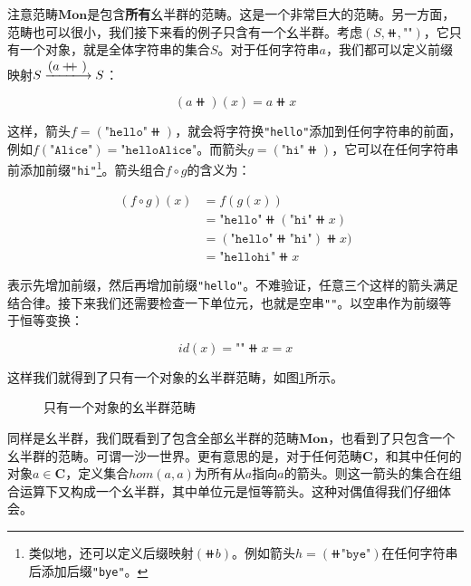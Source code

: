 \documentclass{article}
\begin{document}
注意范畴$\pmb{Mon}$是包含\textbf{所有}幺半群的范畴。这是一个非常巨大的范畴。另一方面，范畴也可以很小，我们接下来看的例子只含有一个幺半群。考虑$(S, \doubleplus, \texttt{""})$，它只有一个对象，就是全体字符串的集合$S$。对于任何字符串$a$，我们都可以定义前缀映射$S \arrowto{(a \doubleplus)} S$：

\[
(a \doubleplus )(x) = a \doubleplus x
\]

这样，箭头$f = (\texttt{"hello"} \doubleplus)$，就会将字符换\texttt{"hello"}添加到任何字符串的前面，例如$f(\texttt{"Alice"})=\texttt{"helloAlice"}$。而箭头$g = (\texttt{"hi"} \doubleplus)$，它可以在任何字符串前添加前缀\texttt{"hi"}\footnote{类似地，还可以定义后缀映射$(\doubleplus b)$。例如箭头$h = (\doubleplus \texttt{"bye"})$在任何字符串后添加后缀\texttt{"bye"}。}。箭头组合$f \circ g$的含义为：

\[
\begin{array}{rl}
(f \circ g)(x) & = f(g(x)) \\
               & = \texttt{"hello"} \doubleplus (\texttt{"hi"} \doubleplus x) \\
               & = (\texttt{"hello"} \doubleplus \texttt{"hi"}) \doubleplus x) \\
               & = \texttt{"hellohi"} \doubleplus x
\end{array}
\]

表示先增加前缀，然后再增加前缀\texttt{"hello"}。不难验证，任意三个这样的箭头满足结合律。接下来我们还需要检查一下单位元，也就是空串\texttt{""}。以空串作为前缀等于恒等变换：

\[
id(x) = \texttt{""} \doubleplus x = x
\]

这样我们就得到了只有一个对象的幺半群范畴，如图\ref{fig:monoid-as-category}所示。

\begin{figure}[htbp]
\centering
{}
\caption{只有一个对象的幺半群范畴}
\label{fig:monoid-as-category}
\end{figure}

同样是幺半群，我们既看到了包含全部幺半群的范畴$\pmb{Mon}$，也看到了只包含一个幺半群的范畴。可谓一沙一世界。更有意思的是，对于任何范畴$\pmb{C}$，和其中任何的对象$a \in \pmb{C}$，定义集合$hom(a, a)$为所有从$a$指向$a$的箭头。则这一箭头的集合在组合运算下又构成一个幺半群，其中单位元是恒等箭头。这种对偶值得我们仔细体会。
\end{document}
